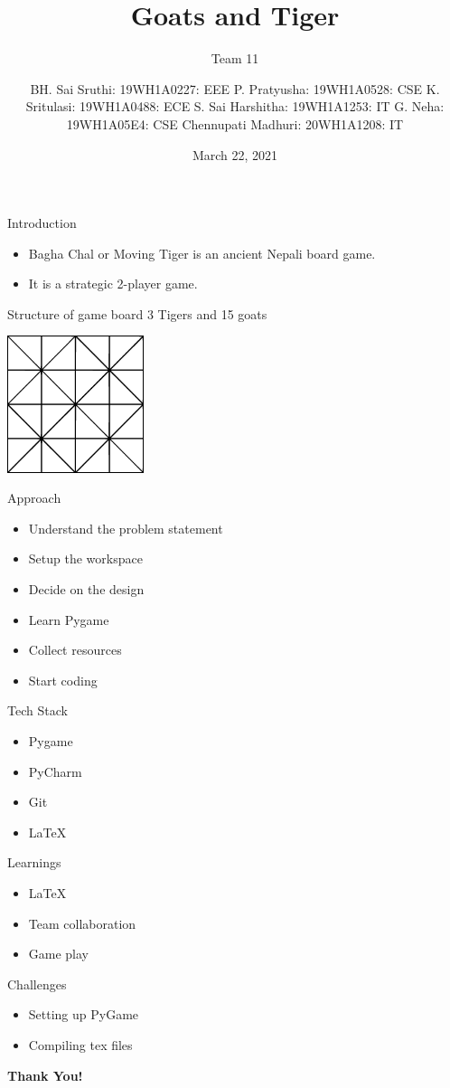 \documentclass[14pt]{beamer}
\title{Goats and Tiger}
\subtitle{Team 11}
\author[]{BH. Sai Sruthi: 19WH1A0227: EEE \newline P. Pratyusha: 19WH1A0528: CSE \newline K. Sritulasi: 19WH1A0488: ECE \newline S. Sai Harshitha: 19WH1A1253: IT \newline G. Neha: 19WH1A05E4: CSE \newline Chennupati Madhuri: 20WH1A1208: IT}
\date{March 22, 2021}
\begin{document}
\begin{frame}
	\titlepage
\end{frame}
\begin{frame}{Introduction}
	\begin{itemize}
		\item Bagha Chal or Moving Tiger is an ancient Nepali board game.
		\item It is a strategic 2-player game.
	\end{itemize}
\end{frame}

\begin{frame}{Structure of game board}
	3 Tigers and 15 goats
	\begin{center}
		\includegraphics[width=4cm, height=4cm]{goatsTiger_conv.eps}
	\end{center}
\end{frame}
\begin{frame}{Approach}
	\begin{itemize}
		\item Understand the problem statement
		\item Setup the workspace
		\item Decide on the design
		\item Learn Pygame
		\item Collect resources
		\item Start coding
	\end{itemize}
\end{frame}

\begin{frame}{Tech Stack}
	\begin{itemize}
		\item Pygame
        	\item PyCharm
		\item Git
        	\item LaTeX
	\end{itemize}
\end{frame}

\begin{frame}{Learnings}
	\begin{itemize}
		\item LaTeX
		\item Team collaboration
		\item Game play
	\end{itemize}
\end{frame}

\begin{frame}{Challenges}
	\begin{itemize}
		\item Setting up PyGame
		\item Compiling tex files
	\end{itemize}
\end{frame}

\begin{frame}
	\begin{center}
	\textbf{\huge Thank You!}
	\end{center}
\end{frame}
\end{document}
